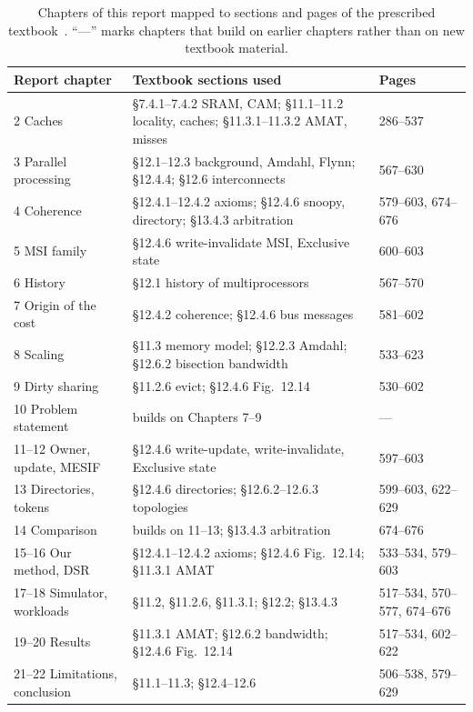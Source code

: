 \begin{table}[htbp]
\centering
\caption{Chapters of this report mapped to sections and pages of the prescribed
textbook~\cite{sarangi2025basic}. ``---'' marks chapters that build on earlier
chapters rather than on new textbook material.}
\label{tab:textbook-map}
\small
\begin{tabular}{@{}L{4.0cm} L{6.6cm} L{2.2cm}@{}}
\toprule
Report chapter & Textbook sections used & Pages \\
 Caches & \S7.4.1--7.4.2 SRAM, CAM; \S11.1--11.2 locality, caches; \S11.3.1--11.3.2 AMAT, misses & 286--537 \\
3 Parallel processing & \S12.1--12.3 background, Amdahl, Flynn; \S12.4.4; \S12.6 interconnects & 567--630 \\
4 Coherence & \S12.4.1--12.4.2 axioms; \S12.4.6 snoopy, directory; \S13.4.3 arbitration & 579--603, 674--676 \\
5 MSI family & \S12.4.6 write-invalidate MSI, Exclusive state & 600--603 \\
6 History & \S12.1 history of multiprocessors & 567--570 \\
7 Origin of the cost & \S12.4.2 coherence; \S12.4.6 bus messages & 581--602 \\
8 Scaling & \S11.3 memory model; \S12.2.3 Amdahl; \S12.6.2 bisection bandwidth & 533--623 \\
9 Dirty sharing & \S11.2.6 evict; \S12.4.6 Fig.~12.14 & 530--602 \\
10 Problem statement & builds on Chapters 7--9 & --- \\
11--12 Owner, update, MESIF & \S12.4.6 write-update, write-invalidate, Exclusive state & 597--603 \\
13 Directories, tokens & \S12.4.6 directories; \S12.6.2--12.6.3 topologies & 599--603, 622--629 \\
14 Comparison & builds on 11--13; \S13.4.3 arbitration & 674--676 \\
15--16 Our method, DSR & \S12.4.1--12.4.2 axioms; \S12.4.6 Fig.~12.14; \S11.3.1 AMAT & 533--534, 579--603 \\
17--18 Simulator, workloads & \S11.2, \S11.2.6, \S11.3.1; \S12.2; \S13.4.3 & 517--534, 570--577, 674--676 \\
19--20 Results & \S11.3.1 AMAT; \S12.6.2 bandwidth; \S12.4.6 Fig.~12.14 & 517--534, 602--622 \\
21--22 Limitations, conclusion & \S11.1--11.3; \S12.4--12.6 & 506--538, 579--629 \\
\bottomrule
\end{tabular}
\end{table}
